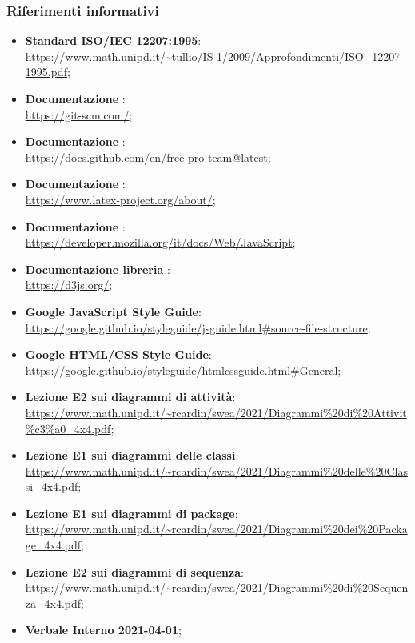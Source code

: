 \subsubsection{Riferimenti informativi}
\begin{itemize}
    \item \textbf{Standard ISO/IEC 12207:1995}: \\
    \url{https://www.math.unipd.it/~tullio/IS-1/2009/Approfondimenti/ISO_12207-1995.pdf};
    \item \textbf{Documentazione }: \\
    \url{https://git-scm.com/};
    \item \textbf{Documentazione }: \\
    \url{https://docs.github.com/en/free-pro-team@latest};
    \item \textbf{Documentazione \glossario{\LaTeX}}: \\
    \url{https://www.latex-project.org/about/};
    \item \textbf{Documentazione }: \\
    \url{https://developer.mozilla.org/it/docs/Web/JavaScript};
    \item \textbf{Documentazione libreria }: \\
    \url{https://d3js.org/};
	\item \textbf{Google JavaScript Style Guide}: \\
	\url{https://google.github.io/styleguide/jsguide.html#source-file-structure};
	\item \textbf{Google HTML/CSS Style Guide}: \\
	\url{https://google.github.io/styleguide/htmlcssguide.html#General};
    \item \textbf{Lezione E2 sui diagrammi di attività}: \\
	\url{https://www.math.unipd.it/~rcardin/swea/2021/Diagrammi%20di%20Attivit%c3%a0_4x4.pdf};
    \item \textbf{Lezione E1 sui diagrammi delle classi}: \\
	\url{https://www.math.unipd.it/~rcardin/swea/2021/Diagrammi%20delle%20Classi_4x4.pdf};
    \item \textbf{Lezione E1 sui diagrammi di package}: \\
	\url{https://www.math.unipd.it/~rcardin/swea/2021/Diagrammi%20dei%20Package_4x4.pdf};
    \item \textbf{Lezione E2 sui diagrammi di sequenza}: \\
	\url{https://www.math.unipd.it/~rcardin/swea/2021/Diagrammi%20di%20Sequenza_4x4.pdf};
    \item \textbf{Verbale Interno 2021-04-01};
\end{itemize}
